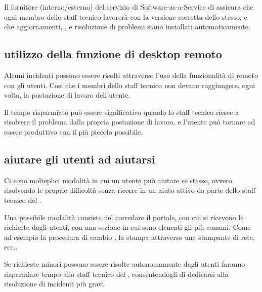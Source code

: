 Il fornitore (interno/esterno) del servizio di \ac{Software-as-a-Service} di  assicura che ogni membro dello staff tecnico lavorerà con la versione corretta dello stesso, e che aggiornamenti, , e risoluzione di problemi siano installati automaticamente.

\subsection[Utilizzo della funzione di desktop remoto]{utilizzo della funzione di desktop remoto}
Alcuni incidenti possono essere risolti attraverso l'uso della funzionalità di  remoto con gli utenti. Cosi che i membri dello staff tecnico non devano raggiungere, ogni volta, la postazione di lavoro dell'utente.

Il tempo risparmiato può essere significativo quando lo staff tecnico riesce a risolvere il problema dalla propria postazione di lavoro, e l'utente può tornare ad essere produttivo con il più piccolo  possibile.

\subsection[Aiutare gli utenti ad aiutarsi]{aiutare gli utenti ad aiutarsi}
Ci sono molteplici modalità in cui un utente può aiutare se stesso, ovvero risolvendo le proprie difficoltà senza ricorre in un aiuto attivo da parte dello staff tecnico del .

Una possibile modalità consiste nel corredare il portale, con cui si ricevono le richieste dagli utenti, con una sezione in cui sono elencati gli  più comuni. Come ad esempio la procedura di cambio , la stampa attraverso una stampante di rete, ecc..

Se richieste minori possono essere risolte autonomamente dagli utenti faranno risparmiare tempo allo staff tecnico del , consentendogli di dedicarsi alla risoluzione di incidenti più gravi.